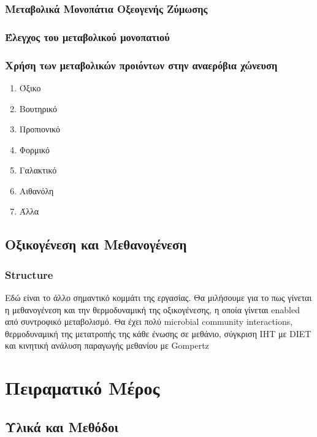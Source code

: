 \documentclass[11pt]{report}
\begin{document}
\section{Μεταβολικά Μονοπάτια Οξεογενής Ζύμωσης}
\label{sec:orge3d9b1b}

\section{Έλεγχος του μεταβολικού μονοπατιού}
\label{sec:orgc2008dd}

\section{Χρήση των μεταβολικών προιόντων στην αναερόβια χώνευση}
\label{sec:orgad9a2d8}
\begin{enumerate}
\item Όξικο
\label{sec:orgabe5e61}
\item Βουτηρικό
\label{sec:org54b6947}
\item Προπιονικό
\label{sec:orgbc6a71c}
\item Φορμικό
\label{sec:org3127bef}
\item Γαλακτικό
\label{sec:org9f83232}
\item Αιθανόλη
\label{sec:orgf915933}
\item Άλλα
\label{sec:orgebaa260}
\end{enumerate}

\chapter{Οξικογένεση και Μεθανογένεση}
\label{sec:org75f39cc}
\label{sec:methanogenesis}

\section{Structure}
\label{sec:org286dd49}
Εδώ είναι το άλλο σημαντικό κομμάτι της εργασίας. Θα μιλήσουμε για το πως γίνεται η μεθανογένεση και την θερμοδυναμική της οξικογένεσης, η οποία γίνεται enabled από συντροφικό μεταβολισμό. Θα έχει πολύ microbial community interactions, θερμοδυναμική της μετατροπής της κάθε ένωσης σε μεθάνιο, σύγκριση IHT με DIET και κινητική ανάλυση παραγωγής μεθανίου με Gompertz

\part{Πειραματικό Μέρος}
\label{sec:org0686483}
\chapter{Υλικά και Μεθόδοι}
\label{sec:orga608b4c}
\label{sec:materials_methods}
\end{document}
